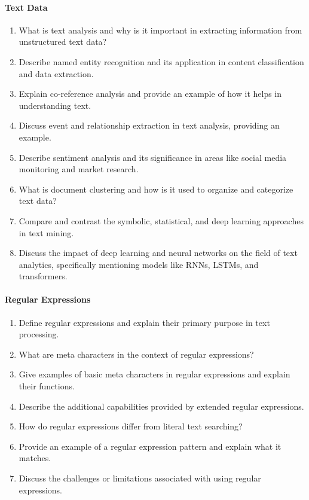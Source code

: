 \paragraph*{Text Data}
\begin{enumerate}
    \item What is text analysis and why is it important in extracting information from unstructured text data?
    \item Describe named entity recognition and its application in content classification and data extraction.
    \item Explain co-reference analysis and provide an example of how it helps in understanding text.
    \item Discuss event and relationship extraction in text analysis, providing an example.
    \item Describe sentiment analysis and its significance in areas like social media monitoring and market research.
    \item What is document clustering and how is it used to organize and categorize text data?
    \item Compare and contrast the symbolic, statistical, and deep learning approaches in text mining.
    \item Discuss the impact of deep learning and neural networks on the field of text analytics, specifically mentioning models like RNNs, LSTMs, and transformers.
\end{enumerate}
\paragraph*{Regular Expressions}
\begin{enumerate}
    \item Define regular expressions and explain their primary purpose in text processing.
    \item What are meta characters in the context of regular expressions?
    \item Give examples of basic meta characters in regular expressions and explain their functions.
    \item Describe the additional capabilities provided by extended regular expressions.
    \item How do regular expressions differ from literal text searching?
    \item Provide an example of a regular expression pattern and explain what it matches.
    \item Discuss the challenges or limitations associated with using regular expressions.
\end{enumerate}
